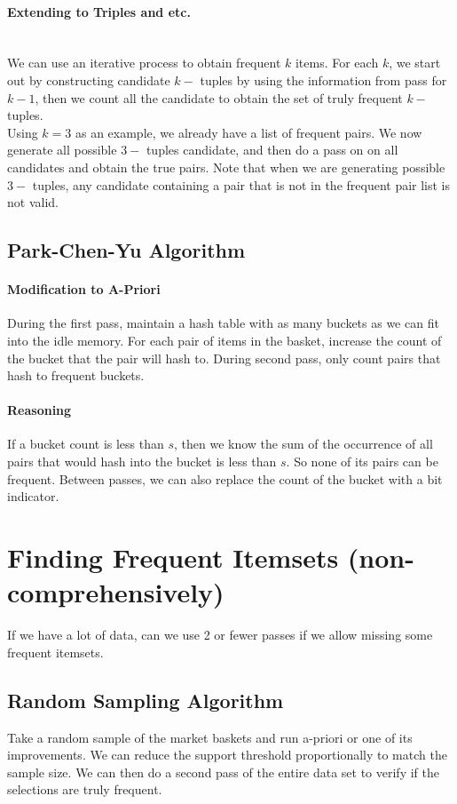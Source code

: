 \paragraph{Extending to Triples and etc.}\mbox{}\\
We can use an iterative process to obtain frequent $k$ items. For each $k$, we start out by constructing candidate $k-$ tuples by using the information from pass for $k-1$, then we count all the candidate to obtain the set of truly frequent $k-$ tuples. \\

Using $k=3$ as an example, we already have a list of frequent pairs. We now generate all possible $3-$ tuples candidate, and then do a pass on on all candidates and obtain the true pairs. Note that when we are generating possible $3-$ tuples, any candidate containing a pair that is not in the frequent pair list is not valid. 



\subsection{Park-Chen-Yu Algorithm} 
\paragraph{Modification to A-Priori} During the first pass, maintain a hash table with as many buckets as we can fit into the idle memory. For each pair of items in the basket, increase the count of the bucket that the pair will hash to. During second pass, only count pairs that hash to frequent buckets. 

\paragraph{Reasoning} If a bucket count is less than $s$, then we know the sum of the occurrence of all pairs that would hash into the bucket is less than $s$. So none of its pairs can be frequent. Between passes, we can also replace the count of the bucket with a bit indicator. 

\section{Finding Frequent Itemsets (non-comprehensively)}
If we have a lot of data, can we use 2 or fewer passes if we allow missing some frequent itemsets. 

\subsection{Random Sampling Algorithm} 
Take a random sample of the market baskets and run a-priori or one of its improvements. We can reduce the support threshold proportionally to match the sample size. We can then do a second pass of the entire data set to verify if the selections are truly frequent. 


